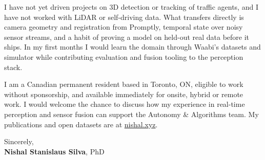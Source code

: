 \documentclass[11pt]{article}
\newcommand{\clName}{Nishal Stanislaus Silva}
\newcommand{\clCity}{Toronto, ON}
\newcommand{\clSite}{https://nishal.xyz}
\newcommand{\clTeam}{the Autonomy \& Algorithms team}
\begin{document}
I have not yet driven projects on 3D detection or tracking of traffic agents, and I have not worked with LiDAR or self-driving data. What transfers directly is camera geometry and registration from Promptly, temporal state over noisy sensor streams, and a habit of proving a model on held-out real data before it ships. In my first months I would learn the domain through Waabi's datasets and simulator while contributing evaluation and fusion tooling to the perception stack.

I am a Canadian permanent resident based in \clCity{}, eligible to work without sponsorship, and available immediately for onsite, hybrid or remote work. I would welcome the chance to discuss how my experience in real-time perception and sensor fusion can support \clTeam{}. My publications and open datasets are at \href{\clSite}{nishal.xyz}.

\vspace{8pt}
Sincerely,\\[2pt]
\textbf{\clName}, PhD
\end{document}
